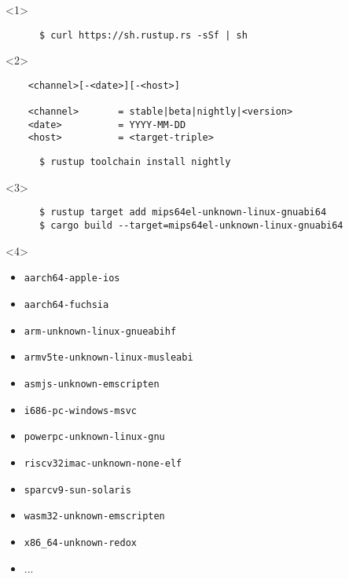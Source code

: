 \begin{frame}[fragile]{\insertsubsection}
  \begin{onlyenv}<1>
    \begin{verbatim}
      $ curl https://sh.rustup.rs -sSf | sh
    \end{verbatim}
  \end{onlyenv}

  \begin{onlyenv}<2>
    \begin{verbatim}
    <channel>[-<date>][-<host>]

    <channel>       = stable|beta|nightly|<version>
    <date>          = YYYY-MM-DD
    <host>          = <target-triple>
  \end{verbatim}

  \begin{verbatim}
      $ rustup toolchain install nightly
    \end{verbatim}
  \end{onlyenv}

  \begin{onlyenv}<3>
  \begin{verbatim}
      $ rustup target add mips64el-unknown-linux-gnuabi64
      $ cargo build --target=mips64el-unknown-linux-gnuabi64
    \end{verbatim}
  \end{onlyenv}

  \begin{onlyenv}<4>
    \begin{itemize}
    \item \texttt{aarch64-apple-ios}
    \item \texttt{aarch64-fuchsia}
    \item \texttt{arm-unknown-linux-gnueabihf}
    \item \texttt{armv5te-unknown-linux-musleabi}
    \item \texttt{asmjs-unknown-emscripten}
    \item \texttt{i686-pc-windows-msvc}
    \item \texttt{powerpc-unknown-linux-gnu}
    \item \texttt{riscv32imac-unknown-none-elf}
    \item \texttt{sparcv9-sun-solaris}
    \item \texttt{wasm32-unknown-emscripten}
    \item \texttt{x86\_64-unknown-redox}
    \item ...
    \end{itemize}
  \end{onlyenv}


\end{frame}
